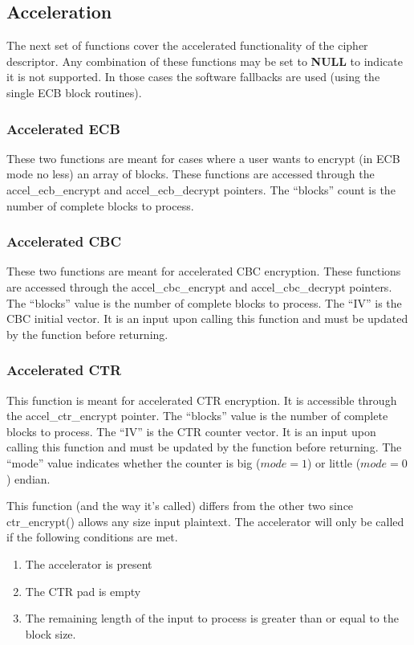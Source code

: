 \documentclass[a4paper]{book}
\begin{document}
\subsection{Acceleration}
The next set of functions cover the accelerated functionality of the cipher descriptor.  Any combination of these functions may be set to \textbf{NULL} to indicate
it is not supported.  In those cases the software fallbacks are used (using the single ECB block routines).

\subsubsection{Accelerated ECB}
These two functions are meant for cases where a user wants to encrypt (in ECB mode no less) an array of blocks.  These functions are accessed
through the accel\_ecb\_encrypt and accel\_ecb\_decrypt pointers.  The ``blocks'' count is the number of complete blocks to process.

\subsubsection{Accelerated CBC} 
These two functions are meant for accelerated CBC encryption.  These functions are accessed through the accel\_cbc\_encrypt and accel\_cbc\_decrypt pointers.
The ``blocks'' value is the number of complete blocks to process.  The ``IV'' is the CBC initial vector.  It is an input upon calling this function and must be
updated by the function before returning.  

\subsubsection{Accelerated CTR}
This function is meant for accelerated CTR encryption.  It is accessible through the accel\_ctr\_encrypt pointer.
The ``blocks'' value is the number of complete blocks to process.  The ``IV'' is the CTR counter vector.  It is an input upon calling this function and must be
updated by the function before returning.  The ``mode'' value indicates whether the counter is big ($mode = 1$) or little ($mode = 0$) endian.

This function (and the way it's called) differs from the other two since ctr\_encrypt() allows any size input plaintext.  The accelerator will only be
called if the following conditions are met.

\begin{enumerate}
   \item The accelerator is present
   \item The CTR pad is empty
   \item The remaining length of the input to process is greater than or equal to the block size.
\end{enumerate}
\end{document}
